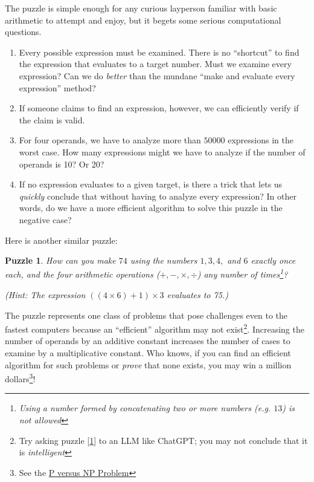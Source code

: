 \documentclass{resonance}
\newtheorem{question}{Puzzle}
\begin{document}
The puzzle is simple enough for any curious layperson familiar with basic arithmetic to attempt and enjoy, but it begets some serious computational questions. 
\begin{enumerate}
\item Every possible expression must be examined. There is no ``shortcut'' to find the expression that evaluates to a target number. Must we examine every expression? Can we do \emph{better} than the mundane ``make and evaluate every expression'' method?

\item If someone claims to find an expression, however, we can efficiently verify if the claim is valid. 

\item For four operands, we have to analyze more than $50000$ expressions in the worst case. How many expressions might we have to analyze if the number of operands is 10? Or 20? 

\item If no expression evaluates to a given target, is there a trick that lets us \emph{quickly} conclude that without having to analyze every expression? In other words, do we have a more efficient algorithm to solve this puzzle in the negative case? 
\end{enumerate}

Here is another similar puzzle:
\begin{question}
\label{puzzle2}
How can you make $74$ using the numbers $1, 3, 4,$ and $6$ exactly once each, and the four arithmetic operations ($+, -, \times, \div$) any number of times\footnote{Using a number formed by concatenating two or more numbers (e.g. $13$) is not allowed}?

({\small Hint: The expression $((4\times6)+1)\times 3$ evaluates to 75.})

\end{question}

The puzzle represents one class of problems that pose challenges even to the fastest computers because an ``efficient'' algorithm may not exist\footnote{Try asking puzzle [\ref{puzzle2}] to an LLM like ChatGPT; you may not conclude that it is \emph{intelligent}}. Increasing the number of operands by an additive constant increases the number of cases to examine by a multiplicative constant. Who knows, if you can find an efficient algorithm for such problems or \emph{prove} that none exists, you may win a million dollars\footnote{See the \href{https://en.wikipedia.org/wiki/P_versus_NP_problem}{P versus NP Problem}}!
\end{document}
